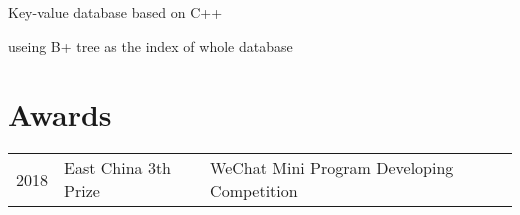 \documentclass[]{deedy-resume-openfont}
\begin{document}
\begin{minipage}[t]{0.68\textwidth}
\begin{tightemize}
    \item Key-value database based on C++
    \item useing B+ tree as the index of whole database 
\end{tightemize}
\sectionsep



\section{Awards} 
\begin{tabular}{rll}
2018         & East China 3th Prize  & WeChat Mini Program Developing Competition \\
\end{tabular}
\sectionsep


% 
% 

\end{minipage} 
\end{document}
